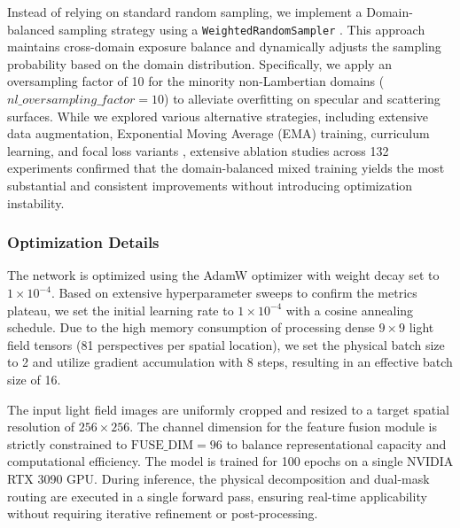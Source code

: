 Instead of relying on standard random sampling, we implement a Domain-balanced sampling strategy using a \texttt{WeightedRandomSampler} \cite{he2016deep}. This approach maintains cross-domain exposure balance and dynamically adjusts the sampling probability based on the domain distribution. Specifically, we apply an oversampling factor of 10 for the minority non-Lambertian domains ($nl\_oversampling\_factor = 10$) to alleviate overfitting on specular and scattering surfaces. While we explored various alternative strategies, including extensive data augmentation, Exponential Moving Average (EMA) training, curriculum learning, and focal loss variants \cite{lin2017focal}, extensive ablation studies across 132 experiments confirmed that the domain-balanced mixed training yields the most substantial and consistent improvements without introducing optimization instability.

\subsubsection{Optimization Details}
The network is optimized using the AdamW optimizer \cite{loshchilov2019adamw} with weight decay set to $1 \times 10^{-4}$. Based on extensive hyperparameter sweeps to confirm the metrics plateau, we set the initial learning rate to $1 \times 10^{-4}$ with a cosine annealing schedule. Due to the high memory consumption of processing dense $9 \times 9$ light field tensors (81 perspectives per spatial location), we set the physical batch size to 2 and utilize gradient accumulation with 8 steps, resulting in an effective batch size of 16. 

The input light field images are uniformly cropped and resized to a target spatial resolution of $256 \times 256$. The channel dimension for the feature fusion module is strictly constrained to $\text{FUSE\_DIM} = 96$ to balance representational capacity and computational efficiency. The model is trained for 100 epochs on a single NVIDIA RTX 3090 GPU. During inference, the physical decomposition and dual-mask routing are executed in a single forward pass, ensuring real-time applicability without requiring iterative refinement or post-processing.